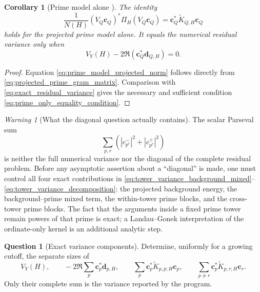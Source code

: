 \documentclass[11pt]{amsart}
\numberwithin{equation}{section}
\theoremstyle{plain}
\newtheorem{corollary}[theorem]{Corollary}
\theoremstyle{definition}
\newtheorem{question}[theorem]{Question}
\theoremstyle{remark}
\newtheorem{warning}[theorem]{Warning}
\newcommand{\1}{\mathbf{1}}
\begin{document}
\begin{corollary}[Prime model alone {}]
\label{cor:prime_model_variance_only}
The identity
\begin{equation}
\frac1{N(H)}
(V_Q\mathbf c_Q)^\ast\Pi_H(V_Q\mathbf c_Q)
=
\mathbf c_Q^\ast\widetilde K_{Q,H}\mathbf c_Q
\label{eq:prime_model_projected_norm}
\end{equation}
holds for the projected prime model alone.  It equals the numerical
residual variance only when
\begin{equation}
V_Y(H)-2\Re(\mathbf c_Q^\ast\mathbf d_{Q,H})=0.
\label{eq:prime_only_equality_condition}
\end{equation}
\end{corollary}

\begin{proof}
Equation \eqref{eq:prime_model_projected_norm} follows directly from
\eqref{eq:projected_prime_gram_matrix}.  Comparison with
\eqref{eq:exact_residual_variance} gives the necessary and sufficient
condition \eqref{eq:prime_only_equality_condition}.
\end{proof}

\begin{warning}[What the diagonal question actually contains]
\label{warn:diagonal_issue}
The scalar Parseval sum
\begin{equation}
\sum_{p,r}
\left(|c_{p^r}^-|^2+|c_{p^r}^+|^2\right)
\label{eq:ordinary_parseval_diagonal}
\end{equation}
is neither the full numerical variance nor the diagonal of the complete
residual problem.  Before any asymptotic assertion about a ``diagonal'' is
made, one must control all four exact contributions in
\eqref{eq:tower_variance_background_mixed}--
\eqref{eq:tower_variance_decomposition}: the projected background energy,
the background--prime mixed term, the within-tower prime blocks, and the
cross-tower prime blocks.  The fact that the arguments inside a fixed
prime tower remain powers of that prime is exact; a Landau--Gonek
interpretation of the ordinate-only kernel is an additional analytic step.
\end{warning}

\begin{question}[Exact variance components]
\label{question:tower_block_energy}
Determine, uniformly for a growing cutoff, the separate sizes of
\begin{equation}
V_Y(H),
\qquad
-2\Re\sum_p\mathbf c_p^\ast\mathbf d_{p,H},
\qquad
\sum_p\mathbf c_p^\ast\widetilde K_{p,p;H}\mathbf c_p,
\qquad
\sum_{p\neq r}\mathbf c_p^\ast\widetilde K_{p,r;H}\mathbf c_r.
\label{eq:four_variance_components}
\end{equation}
Only their complete sum is the variance reported by the program.
\end{question}
\end{document}
